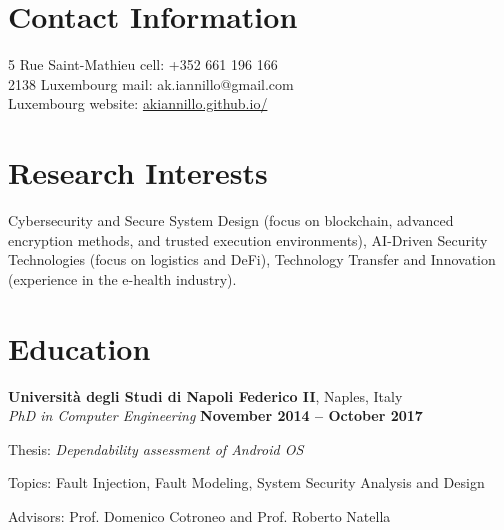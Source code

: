 \documentclass[margin,line]{resume}
\newif\ifReferences
\newif\ifOnline
\begin{document}
\Referencesfalse
\Onlinefalse


\begin{resume}


\section{\mysidestyle Contact Information}
\ifOnline
	mail: ak.iannillo@gmail.com	 							\hfill Luxembourg\\
\else
    5 Rue Saint-Mathieu				                   			\hfill cell: +352 661 196 166\\
    2138 Luxembourg								        \hfill mail: ak.iannillo@gmail.com\\
    Luxembourg										\hfill website: \url{akiannillo.github.io/}\\
\fi




\section{\mysidestyle Research Interests}
Cybersecurity and Secure System Design (focus on blockchain, advanced encryption methods, and trusted execution environments), AI-Driven Security Technologies (focus on logistics and DeFi), Technology Transfer and Innovation (experience in the e-health industry).


\section{\mysidestyle Education}
\textbf{Universit\`a degli Studi di Napoli Federico II}, Naples, Italy \vspace{1mm}\\%
\textsl{PhD in Computer Engineering} \hfill \textbf{November 2014 -- October 2017}\vspace{-3mm}\\\vspace{-1mm}%
\begin{list2}
	\item Thesis: \textsl{Dependability assessment of Android OS}
        \item Topics: Fault Injection, Fault Modeling, System Security Analysis and Design
	\item Advisors: Prof. Domenico Cotroneo and Prof. Roberto Natella
\end{list2}


\end{resume}
\end{document}
